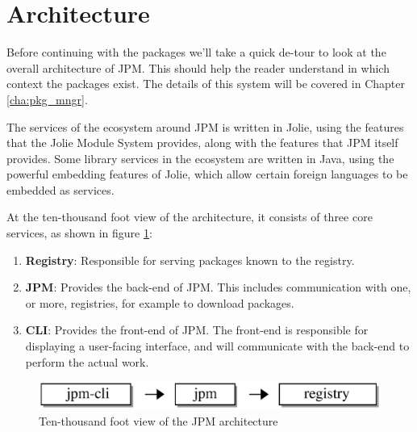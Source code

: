 \section{Architecture}
\label{sec:jpm_simple_arch}


Before continuing with the packages we'll take a quick de-tour to look at the
overall architecture of JPM. This should help the reader understand in which
context the packages exist. The details of this system will be covered in
Chapter \ref{cha:pkg_mngr}.

The services of the ecosystem around JPM is written in Jolie, using the
features that the Jolie Module System provides, along with the features that
JPM itself provides. Some library services in the ecosystem are written in
Java, using the powerful embedding features of Jolie, which allow certain
foreign languages to be embedded as services.

At the ten-thousand foot view of the architecture, it consists of three
core services, as shown in figure \ref{fig:high_level_arch}:

\begin{enumerate}

\item \textbf{Registry}: Responsible for serving packages known to the
registry.

\item \textbf{JPM}: Provides the back-end of JPM. This includes communication
with one, or more, registries, for example to download packages.

\item \textbf{CLI}: Provides the front-end of JPM. The front-end is responsible
for displaying a user-facing interface, and will communicate with the back-end
to perform the actual work.

\end{enumerate}

\begin{figure}[H]
\centering
\includegraphics[width=1.0\textwidth]{packages/high_level_arch.eps}
\caption{Ten-thousand foot view of the JPM architecture}
\label{fig:high_level_arch}
\end{figure}

